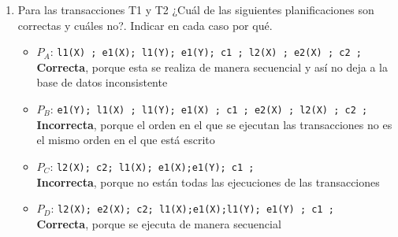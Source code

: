 \begin{enumerate}

\item Para las transacciones T1 y T2 ¿Cuál de las siguientes planificaciones son correctas y cuáles no?. Indicar en cada caso por qué.
\begin{itemize}

\item $P_A$: \texttt{l1(X) ; e1(X); l1(Y); e1(Y); c1 ; l2(X) ; e2(X) ; c2 ;} \\ \textbf{Correcta}, porque esta se realiza de manera secuencial y así no deja a la base de datos inconsistente

\item $P_B$: \texttt{e1(Y); l1(X) ; l1(Y); e1(X) ; c1 ; e2(X) ; l2(X) ; c2 ;} \\ \textbf{Incorrecta}, porque el orden en el que se ejecutan las transacciones no es el mismo orden en el que está escrito

\item $P_C$: \texttt{l2(X); c2; l1(X); e1(X);e1(Y); c1 ;} \\ \textbf{Incorrecta}, porque no están todas las ejecuciones de las transacciones

\item $P_D$: \texttt{l2(X); e2(X); c2; l1(X);e1(X);l1(Y); e1(Y) ; c1 ;} \\ \textbf{Correcta}, porque se ejecuta de manera secuencial
\end{itemize}


\end{enumerate}
